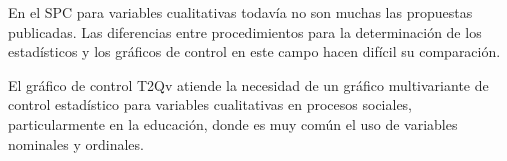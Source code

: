 \documentclass[mathematics,article,submit,moreauthors,pdftex]{mdpi}
\begin{document}
En el SPC para variables cualitativas todavía no son muchas las
propuestas publicadas. Las diferencias entre procedimientos para la
determinación de los estadísticos y los gráficos de control en este
campo hacen difícil su comparación.

El gráfico de control T2Qv atiende la necesidad de un gráfico
multivariante de control estadístico para variables cualitativas en
procesos sociales, particularmente en la educación, donde es muy común
el uso de variables nominales y ordinales.

%

\vspace{6pt}









\end{document}

